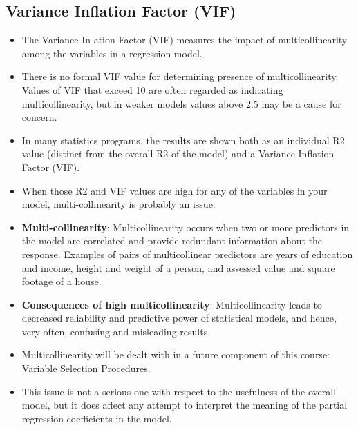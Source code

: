 \documentclass[]{report}
\begin{document}
\subsection{Variance Inflation Factor (VIF)}
\begin{itemize}
\item  The Variance In
ation Factor (VIF) measures the impact of multicollinearity among the variables in a
regression model.
\item  There is no formal VIF value for determining presence of multicollinearity. Values of VIF that exceed 10
are often regarded as indicating multicollinearity, but in weaker models values above 2.5 may be a cause
for concern.
\item  In many statistics programs, the results are shown both as an individual R2 value (distinct from the
overall R2 of the model) and a Variance Inflation Factor (VIF).
\item  When those R2 and VIF values are high for any of the variables in your model, multi-collinearity is
probably an issue.

\item \textbf{Multi-collinearity}: Multicollinearity occurs when two or more predictors in the model are
correlated and provide redundant information about the response. Examples of pairs of multicollinear predictors are years of education and income, height and weight of a person, and assessed value and square footage
of a house.

\item \textbf{Consequences of high multicollinearity}:
Multicollinearity leads to decreased reliability and predictive power of statistical models, and hence, very often, confusing and misleading results.
\item Multicollinearity will be dealt with in a future component of this course: Variable Selection Procedures.
\item This issue is not a serious one with respect to the
usefulness of the overall model, but it does affect any attempt to interpret the meaning of the partial regression
coefficients in the model.


\end{itemize}
\end{document}
